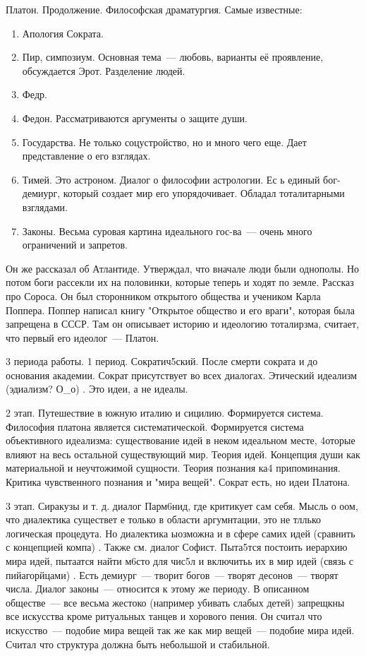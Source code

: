 Платон. Продолжение. 
Философская драматургия. 
Самые известные:

\begin{enumerate} 
	\item Апология Сократа. 
	\item Пир, симпозиум. Основная тема~--- любовь, варианты её проявление, обсуждается Эрот. Разделение людей. 
	\item Федр. 
	\item Федон. Рассматриваются аргументы о защите души. 
	\item Государства. Не только соцустройство, но и много чего еще. Дает представление о его взглядах. 
	\item Тимей. Это астроном. Диалог о философии астрологии. Ес ь единый бог-демиург, который создает мир его упорядочивает. Обладал тоталитарными взглядами. 
	\item Законы. Весьма суровая картина идеального гос-ва~--- очень много ограничений и запретов.
\end{enumerate}

 

Он же рассказал об Атлантиде. 
Утверждал, что вначале люди были однополы. Но потом боги рассекли их на половинки, которые теперь и ходят по земле. 
Рассказ про Сороса. Он был сторонником открытого общества и учеником Карла Поппера. 
Поппер написал книгу "Открытое общество и его враги", которая была запрещена в СССР. 
Там он описывает историю и идеологию тоталирзма, считает, что первый его идеолог~--- Платон. 

3 периода работы. 
1 период. Сократич5ский. После смерти сократа и до основания академии. Сократ присутствует во всех диалогах. Этический идеализм (эдиализм? О_о) . Это идеи, а не идеалы. 

2 этап. Путешествие в южную италию и сицилию. Формируется система. Философия платона является систематической. 
Формируется система объективного идеализма: существование идей в неком идеальном месте, 4оторые влияют на весь остальной существующий мир. Теория идей. Концепция души как материальной и неучтожимой сущности. 
Теория познания ка4 припоминания. Критика чувственного познания и "мира вещей". Сократ есть, но идеи Платона. 

3 этап. Сиракузы и т. д. диалог Парм6нид, где критикует сам себя. Мысль о оом, что диалектика существет е только в области аргумнтации, это не тллько логическая процедута. 
Но диалектика ыозможна и в сфере самих идей (сравнить с концепцией компа) . Также см. диалог Софист. Пыта5тся постоить иерархию мира идей, пытаатся найти м6сто для чис5л и включитьь их в мир идей (связь с пийагорйцами) . 
Есть демиург~--- творит богов~--- творят десонов~--- творят числа. Диалог законы~--- относится к этому же периоду. 
В описанном обществе~--- все весьма жестоко (например убивать слабых детей) запрещкны все искусства кроме ритуальных танцев и хорового пения. 
Он считал что искусство~--- подобие мира вещей так же как мир вещей~--- подобие мира идей. Считал что структура должна быть небольшой и стабильной. 

